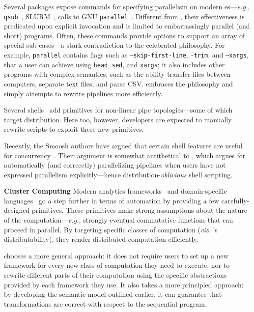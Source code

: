 \documentclass[sigplan,10pt,review,anonymous]{acmart}
\newcommand{\eg}{{\em e.g.}, }
\newcommand{\heading}[1]{\vspace{4pt}\noindent\textbf{#1}\enspace}
\newcommand{\ttt}[1]{\texttt{\small #1}}
\begin{document}
Several packages expose commands for specifying parallelism on modern \unix{}es---\eg \ttt{qsub}~\cite{gentzsch2001sun}, \textsc{SLURM}~\cite{yoo2003slurm}, calls to \textsc{GNU} \ttt{parallel}~\cite{Tange2011a}. %
Different from \sys, their effectiveness is predicated upon explicit invocation and is limited to embarrassingly parallel (and short) programs.
Often, these commands provide options to support an array of special sub-cases---a stark contradiction to the celebrated \unix philosophy.
For example, \ttt{parallel} contains flags such as \ttt{--skip-first-line}, \ttt{-trim}, and \ttt{--xargs}, that a \unix user can achieve using \ttt{head}, \ttt{sed}, and \ttt{xargs}; it also includes other programs with complex semantics, such as the ability transfer files between computers, separate text files, and parse CSV.
\sys embraces the \unix philosophy and simply attempts to rewrite pipelines more efficiently.

Several shells~\cite{duff1990rc, mcdonald1988support, dagsh:17} add primitives for non-linear pipe topologies---some of which target distribution.
Here too, however, developers are expected to manually rewrite scripts to exploit these new primitives.

Recently, the Smoosh authors have argued that certain shell features are useful for concurrency~\cite{smoosh:18}.
Their argument is somewhat antithetical to \sys, %
  which argues for automatically (and correcctly) parallelizing pipelines when users have not expressed parallelism explicitly---hence distribution-\emph{oblivious} shell scripting.


\heading{Cluster Computing}
Modern analytics frameworks~\cite{mapreduce:08, ciel:11, spark:12, naiad:13} and domain-specific languages~\cite{alvaro2011consistency, distal:13, meiklejohn2015lasp} go a step further in terms of automation by providing a few carefully-designed primitives.
These primitives make strong assumptions about the nature of the computation---\eg strongly-eventual commutative functions that can proceed in parallel.
By targeting specific classes of computation (\emph{viz.} \sys's distributability), they render distributed computation efficiently.

\sys chooses a more general approach:
  it does not require users to set up a new framework for every new class of computation they need to execute, nor to rewrite different parts of their computation using the specific abstractions provided by each framework they use.
It also takes a more principled approach: by developing the semantic model outlined earlier, it can guarantee that transformations are correct with respect to the sequential program.
\end{document}
